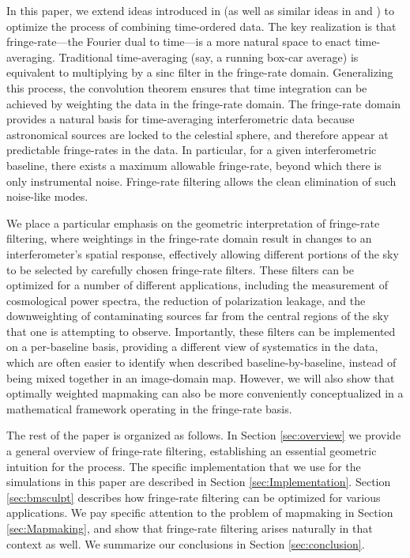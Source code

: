 \documentclass[twocolumn,apj,numberedappendix]{emulateapj}
\begin{document}
In this paper, we extend ideas introduced in \citet{parsons_backer2009} (as well as similar ideas in \citealt{offringa_et_al2012} and \citealt{shaw_et_al2013}) to optimize the process of combining time-ordered data. The key realization is that fringe-rate---the Fourier dual to time---is a
more natural space to enact time-averaging. Traditional time-averaging (say, a running box-car average)
is equivalent to multiplying by a sinc filter in the fringe-rate domain. Generalizing this process, the
convolution theorem ensures that time integration can be achieved by 
weighting the data in the fringe-rate domain. The fringe-rate domain provides a natural basis for time-averaging interferometric
data because astronomical sources are locked to the celestial sphere, and therefore appear at
predictable fringe-rates in the data. In particular, for a given interferometric baseline, there exists
a maximum allowable fringe-rate, beyond which there is only instrumental noise. Fringe-rate filtering
allows the clean elimination of such noise-like modes.

We place a particular emphasis on the geometric interpretation of fringe-rate filtering,
where weightings in the fringe-rate domain result in changes to an interferometer's spatial response,
effectively allowing different portions of the sky to be selected by carefully chosen fringe-rate filters.
These filters can be optimized for a number of different applications, including the measurement
of cosmological power spectra, the reduction of polarization leakage, and the downweighting of
contaminating sources far from the central regions of the sky that one is attempting to observe.
Importantly, these filters can be implemented on a per-baseline basis, providing a different view
of systematics in the data, which are often easier to identify when described baseline-by-baseline,
instead of being mixed together in an image-domain map. However, we will also show that 
optimally weighted mapmaking can also be more conveniently conceptualized in a mathematical
framework operating in the fringe-rate basis.

The rest of the paper is organized as follows. In Section \ref{sec:overview} we provide a general
overview of fringe-rate filtering, establishing an essential geometric intuition for the process. The
specific implementation that we use for the simulations in this paper are described in Section
\ref{sec:Implementation}. Section \ref{sec:bmsculpt} describes how fringe-rate filtering can be
optimized for various applications. We pay specific attention to the problem of mapmaking in
Section \ref{sec:Mapmaking}, and show that fringe-rate filtering arises naturally in that context as well.
We summarize our conclusions in Section \ref{sec:conclusion}.
\end{document}
